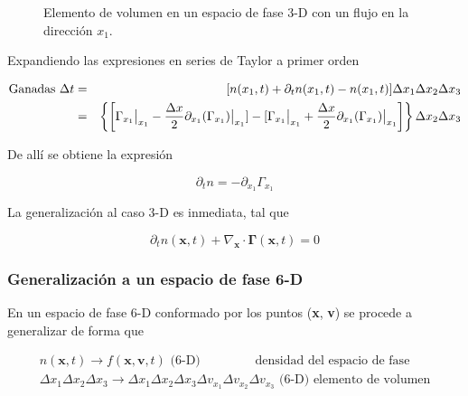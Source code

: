 \begin{figure}[htb!]
  \centering
  \label{fig:box}
  \caption{Elemento de volumen en un espacio de fase 3-D con un flujo en la direcci\'on $x_1$.}
\end{figure}

Expandiendo las expresiones en series de Taylor a primer orden

\begin{eqnarray}
  \text{Ganadas }\Delta t &=& [ n(x_1,t) + \partial_t n(x_1,t) - n(x_1, t)]\Delta x_1\Delta x_2\Delta x_3 \nonumber\\ 
                          &=& \left\{ \left[\Gamma_{x_1}\big{|}_{x_1} - \frac{\Delta x}{2}\partial_{x_1}(\Gamma_{x_1})\big{|}_{x_1}] - [\Gamma_{x_1}\big{|}_{x_1} + \frac{\Delta x}{2}\partial_{x_1}(\Gamma_{x_1})\big{|}_{x_1}\right]\right\}\Delta x_2\Delta x_3\nonumber
  \end{eqnarray}

De all\'i se obtiene la expresi\'on

\begin{equation*}
  \partial_{t} n = -\partial_{x_1}\Gamma_{x_1}
\end{equation*}

La generalizaci\'on al caso 3-D es inmediata, tal que 

\begin{equation*}
  \partial_t n(\textbf{x}, t) + \nabla_\textbf{x}\cdot\pmb{\Gamma}(\textbf{x},t) = 0
\end{equation*}

\subsubsection{Generalizaci\'on a un espacio de fase 6-D}

En un espacio de fase 6-D conformado por los puntos (\textbf{x}, \textbf{v}) se procede a generalizar de forma que 

\begin{eqnarray*}
  n(\textbf{x},t) \rightarrow f(\textbf{x}, \textbf{v},t) \text{ (6-D) } \quad \quad \quad \quad \text{densidad del espacio de fase}\\
  \Delta x_1\Delta x_2\Delta x_3 \rightarrow \Delta x_{1}\Delta x_2\Delta x_3\Delta v_{x_1}\Delta v_{x_2}\Delta v_{x_3} \text{ (6-D) } \text{elemento de volumen}
\end{eqnarray*}

